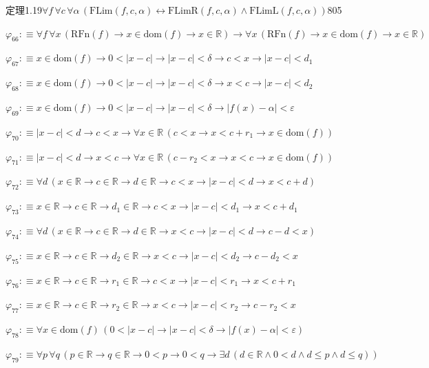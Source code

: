 \begin{fullproof}{定理1.19}{$\forall f\,\forall c\,\forall \alpha\,(\mathrm{FLim}(f,c,\alpha) \leftrightarrow \mathrm{FLimR}(f,c,\alpha) \land \mathrm{FLimL}(f,c,\alpha))$}{805}
\begin{abbrevlist}
\item $\varphi_{66} :\equiv \forall f\,\forall x\,(\mathrm{RFn}(f) \to x \in \mathrm{dom}(f) \to x \in \mathbb{R}) \to \forall x\,(\mathrm{RFn}(f) \to x \in \mathrm{dom}(f) \to x \in \mathbb{R})$
\item $\varphi_{67} :\equiv x \in \mathrm{dom}(f) \to 0 < \lvert x - c \rvert \to \lvert x - c \rvert < \delta \to c < x \to \lvert x - c \rvert < d_{1}$
\item $\varphi_{68} :\equiv x \in \mathrm{dom}(f) \to 0 < \lvert x - c \rvert \to \lvert x - c \rvert < \delta \to x < c \to \lvert x - c \rvert < d_{2}$
\item $\varphi_{69} :\equiv x \in \mathrm{dom}(f) \to 0 < \lvert x - c \rvert \to \lvert x - c \rvert < \delta \to \lvert f(x) - \alpha \rvert < \varepsilon$
\item $\varphi_{70} :\equiv \lvert x - c \rvert < d \to c < x \to \forall x \in \mathbb{R}\,(c < x \to x < c + r_{1} \to x \in \mathrm{dom}(f))$
\item $\varphi_{71} :\equiv \lvert x - c \rvert < d \to x < c \to \forall x \in \mathbb{R}\,(c - r_{2} < x \to x < c \to x \in \mathrm{dom}(f))$
\item $\varphi_{72} :\equiv \forall d\,(x \in \mathbb{R} \to c \in \mathbb{R} \to d \in \mathbb{R} \to c < x \to \lvert x - c \rvert < d \to x < c + d)$
\item $\varphi_{73} :\equiv x \in \mathbb{R} \to c \in \mathbb{R} \to d_{1} \in \mathbb{R} \to c < x \to \lvert x - c \rvert < d_{1} \to x < c + d_{1}$
\item $\varphi_{74} :\equiv \forall d\,(x \in \mathbb{R} \to c \in \mathbb{R} \to d \in \mathbb{R} \to x < c \to \lvert x - c \rvert < d \to c - d < x)$
\item $\varphi_{75} :\equiv x \in \mathbb{R} \to c \in \mathbb{R} \to d_{2} \in \mathbb{R} \to x < c \to \lvert x - c \rvert < d_{2} \to c - d_{2} < x$
\item $\varphi_{76} :\equiv x \in \mathbb{R} \to c \in \mathbb{R} \to r_{1} \in \mathbb{R} \to c < x \to \lvert x - c \rvert < r_{1} \to x < c + r_{1}$
\item $\varphi_{77} :\equiv x \in \mathbb{R} \to c \in \mathbb{R} \to r_{2} \in \mathbb{R} \to x < c \to \lvert x - c \rvert < r_{2} \to c - r_{2} < x$
\item $\varphi_{78} :\equiv \forall x \in \mathrm{dom}(f)\,(0 < \lvert x - c \rvert \to \lvert x - c \rvert < \delta \to \lvert f(x) - \alpha \rvert < \varepsilon)$
\item $\varphi_{79} :\equiv \forall p\,\forall q\,(p \in \mathbb{R} \to q \in \mathbb{R} \to 0 < p \to 0 < q \to \exists d\,(d \in \mathbb{R} \land 0 < d \land d \leq p \land d \leq q))$

\end{abbrevlist}
\end{fullproof}
